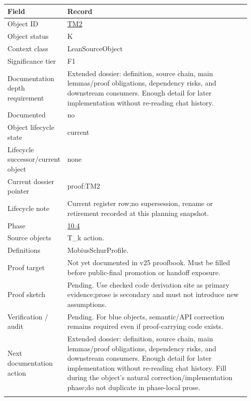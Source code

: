 \begin{longtable}{L{0.16\linewidth} L{0.81\linewidth}}
\hline
\textbf{Field} & \textbf{Record}\\
\hline
Object ID & \hyperlink{object-row-TM2}{TM2}\\
\hline\addlinespace[0.20em]
Object status & K\\
\hline\addlinespace[0.20em]
Context class & LeanSourceObject\\
\hline\addlinespace[0.20em]
Significance tier & F1\\
\hline\addlinespace[0.20em]
Documentation depth requirement & Extended dossier: definition, source chain, main lemmas/\allowbreak{}proof obligations, dependency risks, and downstream consumers. Enough detail for later implementation without re-reading chat history.\\
\hline\addlinespace[0.20em]
Documented & no\\
\hline\addlinespace[0.20em]
Object lifecycle state & current\\
\hline\addlinespace[0.20em]
Lifecycle successor/\allowbreak{}current object & none\\
\hline\addlinespace[0.20em]
Current dossier pointer & proof:TM2\\
\hline\addlinespace[0.20em]
Lifecycle note & Current register row;\newline no supersession, rename or retirement recorded at this planning snapshot.\\
\hline\addlinespace[0.20em]
Phase & \hyperlink{phase-row-10-4}{10.4}\\
\hline\addlinespace[0.20em]
Source objects & T\_k action.\\
\hline\addlinespace[0.20em]
Definitions & MobiusSchurProfile.\\
\hline\addlinespace[0.20em]
Proof target & Not yet documented in v25 proofbook. Must be filled before public-final promotion or handoff exposure.\\
\hline\addlinespace[0.20em]
Proof sketch & Pending. Use checked code derivation site as primary evidence;\newline prose is secondary and must not introduce new assumptions.\\
\hline\addlinespace[0.20em]
Verification /\allowbreak{} audit & Pending. For blue objects, semantic/\allowbreak{}API correction remains required even if proof-carrying code exists.\\
\hline\addlinespace[0.20em]
Next documentation action & Extended dossier: definition, source chain, main lemmas/\allowbreak{}proof obligations, dependency risks, and downstream consumers. Enough detail for later implementation without re-reading chat history. Fill during the object's natural correction/\allowbreak{}implementation phase;\newline do not duplicate in phase-local prose.\\
\hline\addlinespace[0.20em]
\end{longtable}
